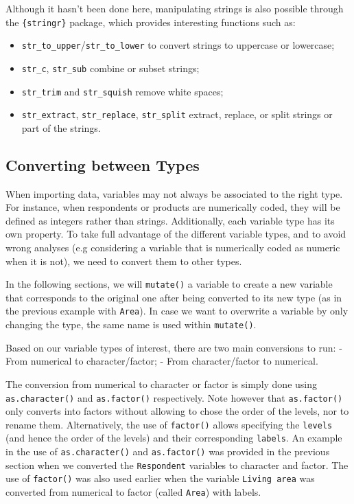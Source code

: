 \documentclass[
]{book}
\providecommand{\tightlist}{%
  \setlength{\itemsep}{0pt}\setlength{\parskip}{0pt}}
\begin{document}
Although it hasn't been done here, manipulating strings is also possible through the \texttt{\{stringr\}} package, which provides interesting functions such as:

\begin{itemize}
\tightlist
\item
  \texttt{str\_to\_upper}/\texttt{str\_to\_lower} to convert strings to uppercase or lowercase;
\item
  \texttt{str\_c}, \texttt{str\_sub} combine or subset strings;
\item
  \texttt{str\_trim} and \texttt{str\_squish} remove white spaces;
\item
  \texttt{str\_extract}, \texttt{str\_replace}, \texttt{str\_split} extract, replace, or split strings or part of the strings.
\end{itemize}

\hypertarget{converting-between-types}{%
\subsection{Converting between Types}\label{converting-between-types}}

When importing data, variables may not always be associated to the right type. For instance, when respondents or products are numerically coded, they will be defined as integers rather than strings. Additionally, each variable type has its own property. To take full advantage of the different variable types, and to avoid wrong analyses (e.g considering a variable that is numerically coded as numeric when it is not), we need to convert them to other types.

In the following sections, we will \texttt{mutate()} a variable to create a new variable that corresponds to the original one after being converted to its new type (as in the previous example with \texttt{Area}). In case we want to overwrite a variable by only changing the type, the same name is used within \texttt{mutate()}.

Based on our variable types of interest, there are two main conversions to run:
- From numerical to character/factor;
- From character/factor to numerical.

The conversion from numerical to character or factor is simply done using \texttt{as.character()} and \texttt{as.factor()} respectively. Note however that \texttt{as.factor()} only converts into factors without allowing to chose the order of the levels, nor to rename them. Alternatively, the use of \texttt{factor()} allows specifying the \texttt{levels} (and hence the order of the levels) and their corresponding \texttt{labels}. An example in the use of \texttt{as.character()} and \texttt{as.factor()} was provided in the previous section when we converted the \texttt{Respondent} variables to character and factor. The use of \texttt{factor()} was also used earlier when the variable \texttt{Living\ area} was converted from numerical to factor (called \texttt{Area}) with labels.
\end{document}

